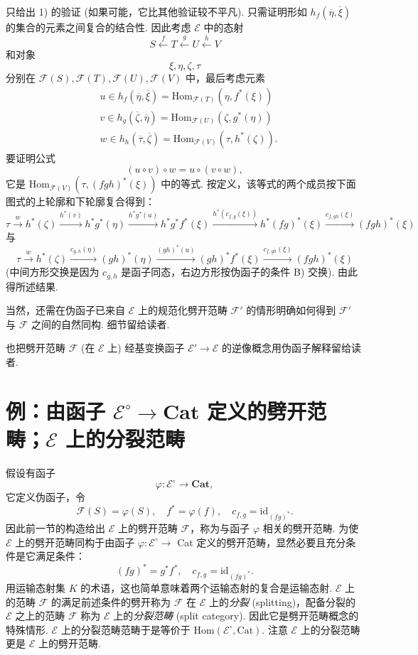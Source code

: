 只给出 1) 的验证 (如果可能，它比其他验证较不平凡). 只需证明形如 $h_f(\overline{\eta}, \overline{\xi})$ 的集合的元素之间复合的结合性. 因此考虑 $\mathcal{E}$ 中的态射
\[
S \xleftarrow{f} T \xleftarrow{g} U \xleftarrow{h} V
\]
和对象
\[
\xi, \eta, \zeta, \tau
\]
分别在 $\mathcal{F}(S), \mathcal{F}(T), \mathcal{F}(U), \mathcal{F}(V)$ 中，最后考虑元素
\[
\begin{array}{rl}
& u \in h_f(\overline{\eta}, \overline{\xi}) = \mathrm{Hom}_{\mathcal{F}(T)}(\eta, f^{*}(\xi)) \\
& v \in h_g(\overline{\zeta}, \overline{\eta}) = \mathrm{Hom}_{\mathcal{F}(U)}(\zeta, g^{*}(\eta)) \\
& w \in h_h(\overline{\tau}, \overline{\zeta}) = \mathrm{Hom}_{\mathcal{F}(V)}(\tau, h^{*}(\zeta)).
\end{array}
\]
要证明公式
\[
(u \circ v) \circ w = u \circ (v \circ w),
\]
它是 $\mathrm{Hom}_{\mathcal{F}(V)}(\tau, (fgh)^{*}(\xi))$ 中的等式. 按定义，该等式的两个成员按下面图式的上轮廓和下轮廓复合得到：
\[
\tau \xrightarrow{w} h^{*}(\zeta) \xrightarrow{h^{*}(v)} h^{*} g^{*}(\eta) \xrightarrow{h^{*} g^{*}(u)} h^{*} g^{*} f^{*}(\xi) \xrightarrow{h^{*}(c_{f,g}(\xi))} h^{*}(fg)^{*}(\xi) \xrightarrow{c_{f,gh}(\xi)} (fgh)^{*}(\xi)
\]
与
\[
\tau \xrightarrow{w} h^{*}(\zeta) \xrightarrow{c_{g,h}(\eta)} (gh)^{*}(\eta) \xrightarrow{(gh)^{*}(u)} (gh)^{*} f^{*}(\xi) \xrightarrow{c_{f,gh}(\xi)} (fgh)^{*}(\xi)
\]
(中间方形交换是因为 $c_{g,h}$ 是函子同态，右边方形按伪函子的条件 B) 交换). 由此得所述结果.

当然，还需在伪函子已来自 $\mathcal{E}$ 上的规范化劈开范畴 $\mathcal{F}'$ 的情形明确如何得到 $\mathcal{F}'$ 与 $\mathcal{F}$ 之间的自然同构. 细节留给读者.

也把劈开范畴 $\mathcal{F}$ (在 $\mathcal{E}$ 上) 经基变换函子 $\mathcal{E}' \to \mathcal{E}$ 的逆像概念用伪函子解释留给读者.

\section{例：由函子 \texorpdfstring{$\mathcal{E}^{\circ} \to \mathbf{Cat}$}{E^o→Cat} 定义的劈开范畴；\texorpdfstring{$\mathcal{E}$}{E} 上的分裂范畴}

假设有函子
\[
\varphi \colon \mathcal{E}^{\circ} \longrightarrow \mathbf{Cat},
\]
它定义伪函子，令
\[
\mathcal{F}(S) = \varphi(S), \quad f^{*} = \varphi(f), \quad c_{f,g} = \mathrm{id}_{(fg)^{*}}.
\]
因此前一节的构造给出 $\mathcal{E}$ 上的劈开范畴 $\mathcal{F}$，称为与函子 $\varphi$ 相关的劈开范畴. 为使 $\mathcal{E}$ 上的劈开范畴同构于由函子 $\varphi \colon \mathcal{E}^{\circ} \to$ Cat 定义的劈开范畴，显然必要且充分条件是它满足条件：
\[
(fg)^{*} = g^{*} f^{*}, \quad c_{f,g} = \mathrm{id}_{(fg)^{*}}.
\]
用运输态射集 $K$ 的术语，这也简单意味着两个运输态射的复合是运输态射. $\mathcal{E}$ 上的范畴 $\mathcal{F}$ 的满足前述条件的劈开称为 $\mathcal{F}$ 在 $\mathcal{E}$ 上的\emph{分裂} (splitting)，配备分裂的 $\mathcal{E}$ 之上的范畴 $\mathcal{F}$ 称为 $\mathcal{E}$ 上的\emph{分裂范畴} (split category). 因此它是劈开范畴概念的特殊情形. $\mathcal{E}$ 上的分裂范畴范畴于是等价于 Hom$(\mathcal{E}^{\circ}, \mathrm{Cat})$. 注意 $\mathcal{E}$ 上的分裂范畴更是 $\mathcal{E}$ 上的劈开范畴.

